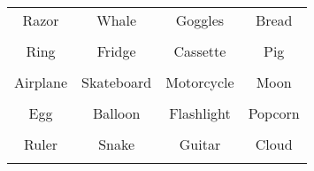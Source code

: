 \documentclass[12pt,a4paper]{article}
\begin{document}
\thispagestyle{empty}
\begin{table}[]
\centering
\Huge
\begin{tabular}{cccc}
 Razor& Whale& Goggles& Bread\\  & & & \\
 Ring& Fridge& Cassette& Pig\\  & & & \\
 Airplane& Skateboard& Motorcycle& Moon\\  & & & \\
 Egg& Balloon& Flashlight& Popcorn\\  & & & \\
 Ruler& Snake& Guitar& Cloud\\  & & & \\
\end{tabular}
\end{table}
\end{document}
